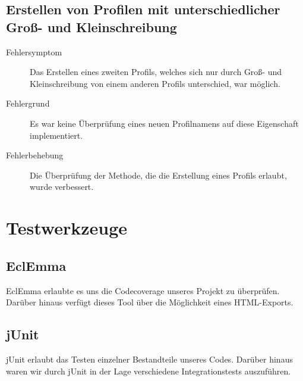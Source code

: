 \documentclass[parskip=full]{scrreprt}
\begin{document}
\section{Erstellen von Profilen mit unterschiedlicher Groß- und Kleinschreibung}
\begin{description}
	\item[Fehlersymptom] Das Erstellen eines zweiten Profils, welches sich nur durch Groß- und Kleinschreibung von einem anderen Profils unterschied, war möglich.
	\item[Fehlergrund] Es war keine Überprüfung eines neuen Profilnamens auf diese Eigenschaft implementiert.
	\item[Fehlerbehebung] Die Überprüfung der Methode, die die Erstellung eines Profils erlaubt, wurde verbessert.
\end{description}

\chapter{Testwerkzeuge}

\section{EclEmma}

EclEmma erlaubte es uns die Codecoverage unseres Projekt zu überprüfen. Darüber hinaus verfügt dieses Tool über die Möglichkeit eines HTML-Exports.

\section{jUnit}

jUnit erlaubt das Testen einzelner Bestandteile unseres Codes. Darüber hinaus waren wir durch jUnit in der Lage verschiedene Integrationstests auszuführen.
\end{document}
